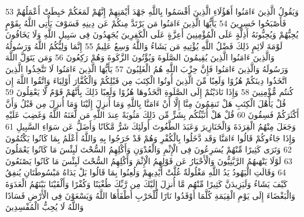 \documentclass[20pt,a4paper]{article}
\begin{document}
{\tiny\colorbox{cl_aya}{53}} وَيَقُولُ الَّذِينَ ءَامَنُوا أَهَؤُلَاءِ الَّذِينَ أَقْسَمُوا بِاللَّهِ جَهْدَ أَيْمَنِهِمْ إِنَّهُمْ لَمَعَكُمْ حَبِطَتْ أَعْمَلُهُمْ فَأَصْبَحُوا خَسِرِينَ
{\tiny\colorbox{cl_aya}{54}} يَأَيُّهَا الَّذِينَ ءَامَنُوا مَن يَرْتَدَّ مِنكُمْ عَن دِينِهِ فَسَوْفَ يَأْتِى اللَّهُ بِقَوْمٍ يُحِبُّهُمْ وَيُحِبُّونَهُ أَذِلَّةٍ عَلَى الْمُؤْمِنِينَ أَعِزَّةٍ عَلَى الْكَفِرِينَ يُجَهِدُونَ فِى سَبِيلِ اللَّهِ وَلَا يَخَافُونَ لَوْمَةَ لَائِمٍ ذَلِكَ فَضْلُ اللَّهِ يُؤْتِيهِ مَن يَشَاءُ وَاللَّهُ وَسِعٌ عَلِيمٌ
{\tiny\colorbox{cl_aya}{55}} إِنَّمَا وَلِيُّكُمُ اللَّهُ وَرَسُولُهُ وَالَّذِينَ ءَامَنُوا الَّذِينَ يُقِيمُونَ الصَّلَوةَ وَيُؤْتُونَ الزَّكَوةَ وَهُمْ رَكِعُونَ
{\tiny\colorbox{cl_aya}{56}} وَمَن يَتَوَلَّ اللَّهَ وَرَسُولَهُ وَالَّذِينَ ءَامَنُوا فَإِنَّ حِزْبَ اللَّهِ هُمُ الْغَلِبُونَ
{\tiny\colorbox{cl_aya}{57}} يَأَيُّهَا الَّذِينَ ءَامَنُوا لَا تَتَّخِذُوا الَّذِينَ اتَّخَذُوا دِينَكُمْ هُزُوًا وَلَعِبًا مِّنَ الَّذِينَ أُوتُوا الْكِتَبَ مِن قَبْلِكُمْ وَالْكُفَّارَ أَوْلِيَاءَ وَاتَّقُوا اللَّهَ إِن كُنتُم مُّؤْمِنِينَ
{\tiny\colorbox{cl_aya}{58}} وَإِذَا نَادَيْتُمْ إِلَى الصَّلَوةِ اتَّخَذُوهَا هُزُوًا وَلَعِبًا ذَلِكَ بِأَنَّهُمْ قَوْمٌ لَّا يَعْقِلُونَ
{\tiny\colorbox{cl_aya}{59}} قُلْ يَأَهْلَ الْكِتَبِ هَلْ تَنقِمُونَ مِنَّا إِلَّا أَنْ ءَامَنَّا بِاللَّهِ وَمَا أُنزِلَ إِلَيْنَا وَمَا أُنزِلَ مِن قَبْلُ وَأَنَّ أَكْثَرَكُمْ فَسِقُونَ
{\tiny\colorbox{cl_aya}{60}} قُلْ هَلْ أُنَبِّئُكُم بِشَرٍّ مِّن ذَلِكَ مَثُوبَةً عِندَ اللَّهِ مَن لَّعَنَهُ اللَّهُ وَغَضِبَ عَلَيْهِ وَجَعَلَ مِنْهُمُ الْقِرَدَةَ وَالْخَنَازِيرَ وَعَبَدَ الطَّغُوتَ أُولَئِكَ شَرٌّ مَّكَانًا وَأَضَلُّ عَن سَوَاءِ السَّبِيلِ
{\tiny\colorbox{cl_aya}{61}} وَإِذَا جَاءُوكُمْ قَالُوا ءَامَنَّا وَقَد دَّخَلُوا بِالْكُفْرِ وَهُمْ قَدْ خَرَجُوا بِهِ وَاللَّهُ أَعْلَمُ بِمَا كَانُوا يَكْتُمُونَ
{\tiny\colorbox{cl_aya}{62}} وَتَرَى كَثِيرًا مِّنْهُمْ يُسَرِعُونَ فِى الْإِثْمِ وَالْعُدْوَنِ وَأَكْلِهِمُ السُّحْتَ لَبِئْسَ مَا كَانُوا يَعْمَلُونَ
{\tiny\colorbox{cl_aya}{63}} لَوْلَا يَنْهَىهُمُ الرَّبَّنِيُّونَ وَالْأَحْبَارُ عَن قَوْلِهِمُ الْإِثْمَ وَأَكْلِهِمُ السُّحْتَ لَبِئْسَ مَا كَانُوا يَصْنَعُونَ
{\tiny\colorbox{cl_aya}{64}} وَقَالَتِ الْيَهُودُ يَدُ اللَّهِ مَغْلُولَةٌ غُلَّتْ أَيْدِيهِمْ وَلُعِنُوا بِمَا قَالُوا بَلْ يَدَاهُ مَبْسُوطَتَانِ يُنفِقُ كَيْفَ يَشَاءُ وَلَيَزِيدَنَّ كَثِيرًا مِّنْهُم مَّا أُنزِلَ إِلَيْكَ مِن رَّبِّكَ طُغْيَنًا وَكُفْرًا وَأَلْقَيْنَا بَيْنَهُمُ الْعَدَوَةَ وَالْبَغْضَاءَ إِلَى يَوْمِ الْقِيَمَةِ كُلَّمَا أَوْقَدُوا نَارًا لِّلْحَرْبِ أَطْفَأَهَا اللَّهُ وَيَسْعَوْنَ فِى الْأَرْضِ فَسَادًا وَاللَّهُ لَا يُحِبُّ الْمُفْسِدِينَ
\end{document}
